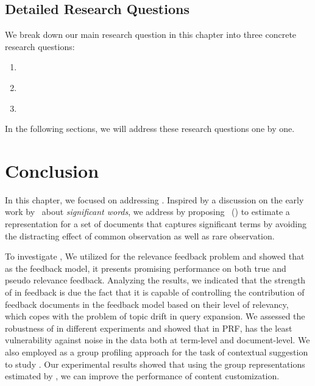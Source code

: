 \subsection{Detailed Research Questions}
We break down our main research question in this chapter into three concrete research questions:
\begin{resqbox}
\begin{enumerate}
\item[\textbf{\resqname{c2.1}}] \emph{}
\item[\textbf{\resqname{c2.2}}] \emph{}
\item[\textbf{\resqname{c2.3}}] \emph{}
\end{enumerate}
\end{resqbox}
In the following sections, we will address these research questions one by one.





\section{Conclusion} 
In this chapter, we focused on addressing \textbf{}.
Inspired by a discussion on the early work by~\citet{Luhn:1958} about \emph{significant words}, we address \textbf{} by proposing \emph{\swlms}\ (\acswlm) to estimate a representation for a set of documents that captures significant terms by avoiding the distracting effect of common observation as well as rare observation.

To investigate \textbf{}, We utilized \acswlm for the relevance feedback problem and showed that as the feedback model, it presents promising performance on both true and pseudo relevance feedback. Analyzing the results, we indicated that the strength of \acswlm in feedback is due the fact that it is capable of controlling the contribution of feedback documents in the feedback model based on their level of relevancy, which copes with the problem of topic drift in query expansion. We assessed the robustness of \acswlm in different experiments and showed that in PRF, \acswlm has the least vulnerability against noise in the data both at term-level and document-level.
%
We also employed \acswlm as a group profiling approach for the task of contextual suggestion to study \textbf{}. Our experimental results showed that using the group representations estimated by \acswlm, we can improve the performance of content customization. 

